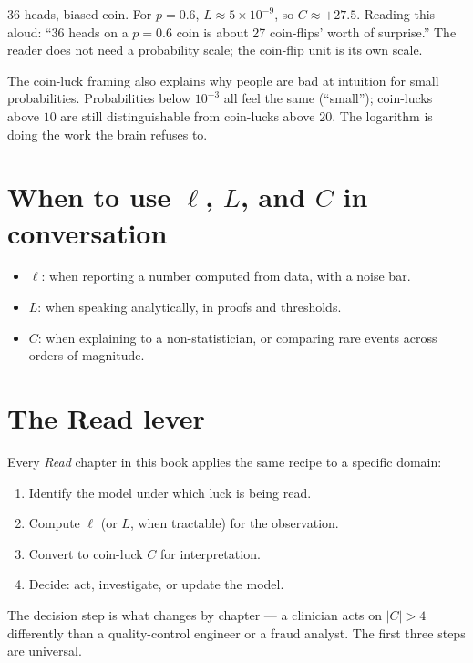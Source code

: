 \begin{example}{36 heads, biased coin.}
For $p=0.6$, $L \approx 5 \times 10^{-9}$, so $C \approx +27.5$.  Reading
this aloud: ``36 heads on a $p=0.6$ coin is about 27 coin-flips' worth of
surprise.''  The reader does not need a probability scale; the coin-flip
unit is its own scale.
\end{example}

The coin-luck framing also explains why people are bad at intuition for
small probabilities.  Probabilities below $10^{-3}$ all feel the same
(``small''); coin-lucks above $10$ are still distinguishable from coin-lucks
above $20$.  The logarithm is doing the work the brain refuses to.

\section{When to use $\ell$, $L$, and $C$ in conversation}

\begin{itemize}
\item $\ell$: when reporting a number computed from data, with a noise
  bar.
\item $L$: when speaking analytically, in proofs and thresholds.
\item $C$: when explaining to a non-statistician, or comparing rare events
  across orders of magnitude.
\end{itemize}

\section{The Read lever}

Every \emph{Read} chapter in this book applies the same recipe to a
specific domain:
\begin{enumerate}
\item Identify the model under which luck is being read.
\item Compute $\ell$ (or $L$, when tractable) for the observation.
\item Convert to coin-luck $C$ for interpretation.
\item Decide: act, investigate, or update the model.
\end{enumerate}

The decision step is what changes by chapter --- a clinician acts on
$|C| > 4$ differently than a quality-control engineer or a fraud analyst.
The first three steps are universal.

